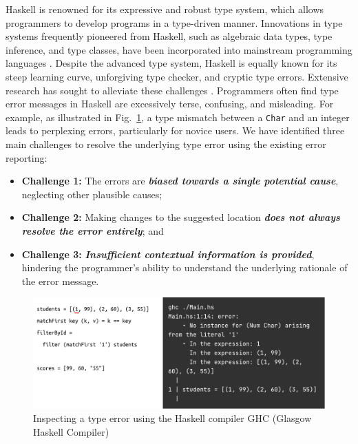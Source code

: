 \documentclass[pdflatex,lineno,sn-nature,Numbered]{sn-jnl}%
\begin{document}
Haskell is renowned for its expressive and robust type system, which allows programmers to develop programs in a type-driven manner. Innovations in type systems frequently pioneered from Haskell, such as algebraic data types, type inference, and type classes, have been incorporated into mainstream programming languages \cite{Hudak2007-kn, TypeScriptTeam_undated-qk, Klabnik_undated-mp, Griesemer_undated-ff}. Despite the advanced type system, Haskell is equally known for its steep learning curve, unforgiving type checker, and cryptic type errors. Extensive research has sought to alleviate these challenges \cite{Tirronen2015-nr, Chen2014-dz, Heeren2003-kd, Zhang2015-xy, Lerner2007-yq, Zhang2017-tj}. Programmers often find type error messages in Haskell are excessively terse, confusing, and misleading. For example, as illustrated in Fig.~\ref{fig:motivation}, a type mismatch between a {\tt Char} and an integer leads to perplexing errors, particularly for novice users. We have identified three main challenges to resolve the underlying type error using the existing error reporting:

\begin{itemize}
    \item {\bf Challenge 1:} The errors are \textbf{\textit{biased towards a single potential cause}}, neglecting other plausible causes;
    \item {\bf Challenge 2:} Making changes to the suggested location \textbf{\textit{does not always resolve the error entirely}}; and
    \item {\bf Challenge 3:} \textbf{\textit{Insufficient contextual information is provided}}, hindering the programmer's ability to understand the underlying rationale of the error message.
\end{itemize}


\begin{figure}[ht!]
    \centering
    \includegraphics[width=\linewidth]{images/motivation}
    \caption{Inspecting a type error using the Haskell compiler GHC (Glasgow Haskell Compiler)}
    \label{fig:motivation}
\end{figure}
\end{document}
